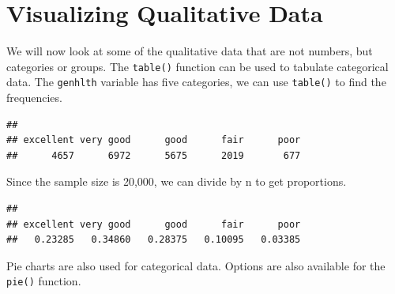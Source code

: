 \documentclass[
]{book}
\newenvironment{Shaded}{\begin{snugshade}}{\end{snugshade}}
\newcommand{\DecValTok}[1]{\textcolor[rgb]{0.00,0.00,0.81}{#1}}
\newcommand{\KeywordTok}[1]{\textcolor[rgb]{0.13,0.29,0.53}{\textbf{#1}}}
\newcommand{\NormalTok}[1]{#1}
\newcommand{\OperatorTok}[1]{\textcolor[rgb]{0.81,0.36,0.00}{\textbf{#1}}}
\begin{document}
\hypertarget{visualizing-qualitative-data}{%
\section{Visualizing Qualitative Data}\label{visualizing-qualitative-data}}

We will now look at some of the qualitative data that are not numbers, but categories or groups. The \texttt{table()} function can be used to tabulate categorical data. The \texttt{genhlth} variable has five categories, we can use \texttt{table()} to find the frequencies.

\begin{Shaded}
\end{Shaded}

\begin{verbatim}
## 
## excellent very good      good      fair      poor 
##      4657      6972      5675      2019       677
\end{verbatim}

Since the sample size is 20,000, we can divide by n to get proportions.

\begin{Shaded}
\end{Shaded}

\begin{verbatim}
## 
## excellent very good      good      fair      poor 
##   0.23285   0.34860   0.28375   0.10095   0.03385
\end{verbatim}

Pie charts are also used for categorical data. Options are also available for the \texttt{pie()} function.

\begin{Shaded}
\end{Shaded}
\end{document}
